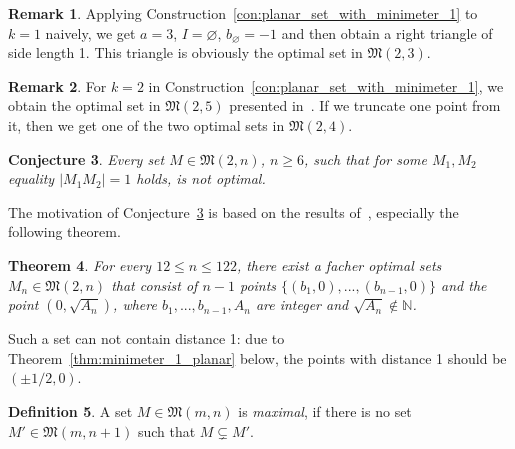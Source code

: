 \documentclass[a4paper,14pt]{article} %
\theoremstyle{plain}
\newtheorem{theorem}{Theorem}[section]
\newtheorem{conjecture}[theorem]{Conjecture}
\theoremstyle{definition}
\newtheorem{definition}[theorem]{Definition}
\newtheorem{remark}[theorem]{Remark}
\begin{document}
\begin{remark}
	Applying Construction~\ref{con:planar_set_with_minimeter_1} to $k=1$ naively,
	we get $a = 3$, $I=\varnothing$, $b_\varnothing = -1$ and then
	obtain a right triangle of side length 1.
	This triangle is obviously the optimal set in $\mathfrak{M}(2,3)$.
\end{remark}

\begin{remark}
	For $k=2$ in Construction~\ref{con:planar_set_with_minimeter_1},
	we obtain the optimal set in $\mathfrak{M}(2,5)$ presented in~\cite[Fig. 1]{harborth1993upper}.
	If we truncate one point from it,
	then we get one of the two optimal sets in $\mathfrak{M}(2,4)$.
\end{remark}

\begin{conjecture}
	\label{con:no_optimal_with_edge_1}
	Every set $M\in\mathfrak{M}(2,n)$, $n\geq 6$, such that for some $M_1,M_2$ equality $|M_1 M_2|=1$ holds,
	is not optimal.
\end{conjecture}

The motivation of Conjecture~\ref{con:no_optimal_with_edge_1} is based on the results of~\cite[Section 5]{kurz2008minimum},
especially the following theorem.

\begin{theorem}
	For every $12 \leq n \leq 122$, there exist a facher optimal sets $M_n\in\mathfrak{M}(2,n)$
	that consist of $n-1$ points $\{ (b_1,0), ..., (b_{n-1},0)\}$
	and the point $(0,\sqrt{A_n})$,
	where $b_1,...,b_{n-1}, A_n$ are integer and $\sqrt{A_n}\notin\mathbb{N}$.
\end{theorem}
Such a set can not contain distance 1: due to Theorem~\ref{thm:minimeter_1_planar} below,
the points with distance 1 should be $(\pm 1/2, 0)$.




\begin{definition}
	\cite{antonov2008maximal}
	A set $M\in \mathfrak{M}(m,n)$ is \textit{maximal},
	if there is no set $M'\in \mathfrak{M}(m,n+1)$
	such that $M \subsetneq M'$.
\end{definition}

\end{document}
